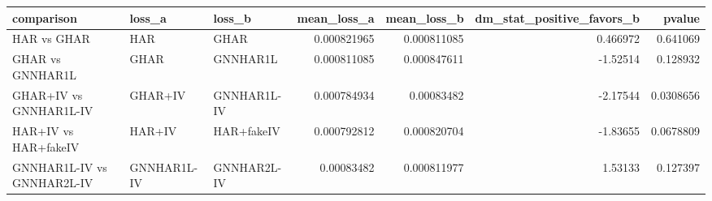 \begin{tabular}{lllrrrr}
\toprule
comparison & loss_a & loss_b & mean_loss_a & mean_loss_b & dm_stat_positive_favors_b & pvalue \\
\midrule
HAR vs GHAR & HAR & GHAR & 0.000821965 & 0.000811085 & 0.466972 & 0.641069 \\
GHAR vs GNNHAR1L & GHAR & GNNHAR1L & 0.000811085 & 0.000847611 & -1.52514 & 0.128932 \\
GHAR+IV vs GNNHAR1L-IV & GHAR+IV & GNNHAR1L-IV & 0.000784934 & 0.00083482 & -2.17544 & 0.0308656 \\
HAR+IV vs HAR+fakeIV & HAR+IV & HAR+fakeIV & 0.000792812 & 0.000820704 & -1.83655 & 0.0678809 \\
GNNHAR1L-IV vs GNNHAR2L-IV & GNNHAR1L-IV & GNNHAR2L-IV & 0.00083482 & 0.000811977 & 1.53133 & 0.127397 \\
\bottomrule
\end{tabular}

